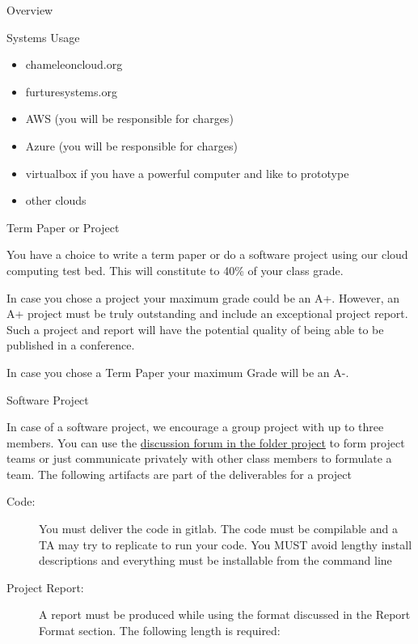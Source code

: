 \begin{edXchapter}{Overview}
\begin{edXsection}{Systems Usage}
\begin{itemize}
\itemsep1pt\parskip0pt
\item
  chameleoncloud.org
\item
  furturesystems.org
\item
  AWS (you will be responsible for charges)
\item
  Azure (you will be responsible for charges)
\item
  virtualbox if you have a powerful computer and like to prototype
\item
  other clouds
\end{itemize}

\end{edXsection}
\begin{edXsection}{Term Paper or Project}\label{term-paper-or-project}

You have a choice to write a term paper or do a software project using
our cloud computing test bed. This will constitute to 40\% of your class
grade.

In case you chose a project your maximum grade could be an A+. However,
an A+ project must be truly outstanding and include an exceptional
project report. Such a project and report will have the potential
quality of being able to be published in a conference.

In case you chose a Term Paper your maximum Grade will be an A-.

\end{edXsection}
\begin{edXsection}{Software Project}\label{software-project}

In case of a software project, we encourage a group project with up to
three members. You can use the
\href{https://piazza.com/class/irqfvh1ctrg2vt}{discussion forum in the
folder project} to form project teams or just communicate privately with
other class members to formulate a team. The following artifacts are
part of the deliverables for a project

\begin{description}
\item[Code:]
You must deliver the code in gitlab. The code must be compilable and a
TA may try to replicate to run your code. You MUST avoid lengthy install
descriptions and everything must be installable from the command line
\item[Project Report:]
A report must be produced while using the format discussed in the Report
Format section. The following length is required:


\end{description}
\end{edXsection}
\end{edXchapter}
